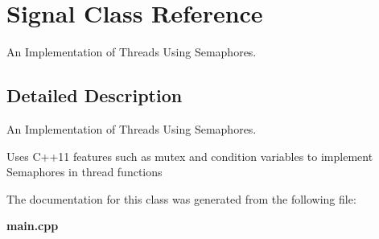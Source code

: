 \section{Signal Class Reference}
\label{class_signal}


An Implementation of Threads Using Semaphores.  




\subsection{Detailed Description}
An Implementation of Threads Using Semaphores. 

Uses C++11 features such as mutex and condition variables to implement Semaphores in thread functions 

The documentation for this class was generated from the following file\+:\begin{DoxyCompactItemize}
\item 
\textbf{ main.\+cpp}\end{DoxyCompactItemize}
